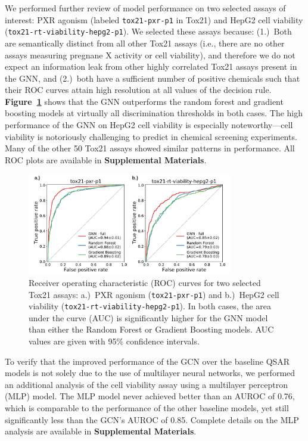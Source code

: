 \documentclass{ws-procs11x85}
\begin{document}
We performed further review of model performance on two selected assays of interest: PXR agonism (labeled \texttt{tox21-pxr-p1} in Tox21) and HepG2 cell viability (\texttt{tox21-rt-viability-hepg2-p1}).
We selected these assays because: (1.)~Both are semantically distinct from all other Tox21 assays (i.e., there are no other assays measuring pregnane X activity or cell viability), and therefore we do not expect an information leak from other highly correlated Tox21 assays present in the GNN, and (2.)~both have a sufficient number of positive chemicals such that their ROC curves attain high resolution at all values of the decision rule.
\textbf{Figure~\ref{fig:4}} shows that the GNN outperforms the random forest and gradient boosting models at virtually all discrimination thresholds in both cases. 
The high performance of the GNN on HepG2 cell viability is especially noteworthy---cell viability is notoriously challenging to predict in chemical screening experiments.
Many of the other 50 Tox21 assays showed similar patterns in performance.
All ROC plots are available in \textbf{Supplemental Materials}.

\begin{figure}
   \centering
   \includegraphics[width=0.8\textwidth]{figures/figure4.pdf}
   \caption{Receiver operating characteristic (ROC) curves for two selected Tox21 assays: a.)~PXR agonism (\texttt{tox21-pxr-p1}) and b.)~HepG2 cell viability (\texttt{tox21-rt-viability-hepg2-p1}). In both cases, the area under the curve (AUC) is significantly higher for the GNN model than either the Random Forest or Gradient Boosting models. AUC values are given with 95\% confidence intervals.}\label{fig:4}
\end{figure}

To verify that the improved performance of the GCN over the baseline QSAR models is not solely due to the use of multilayer neural networks, we performed an additional analysis of the cell viability assay using a multilayer perceptron (MLP) model.
The MLP model never achieved better than an AUROC of 0.76, which is comparable to the performance of the other baseline models, yet still significantly less than the GCN's AUROC of 0.85.
Complete details on the MLP analysis are available in \textbf{Supplemental Materials}.
\end{document}
